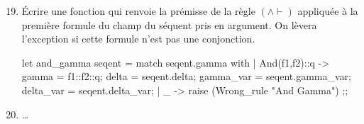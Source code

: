 \documentclass[a4paper,french,bookmarks]{article}
\begin{document}
    \begin{enumerate}
        \setcounter{enumi}{18}
        
        \item Écrire une fonction  qui renvoie la prémisse de la règle $(\land \vdash)$ appliquée à la première formule du champ  du séquent pris en argument. On lèvera l'exception  si cette formule n'est pas une conjonction.
        
        \begin{ocaml}
let and_gamma seqent = match seqent.gamma with
    | And(f1,f2)::q -> {
        gamma = f1::f2::q;
        delta = seqent.delta;
        gamma_var = seqent.gamma_var;
        delta_var = seqent.delta_var;
    }
    | _ -> raise (Wrong_rule "And Gamma")
;;
        \end{ocaml}
        
        \item \dots
    \end{enumerate}


    
\end{document}
